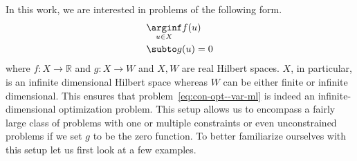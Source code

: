 In this work, we are interested in problems of the following form.
\begin{equation}
\begin{aligned}
    &\underset{u\in X}\arginf f(u)\\
    &\subto g(u)=0 
\end{aligned}   \label{eq:con-opt--var-ml}
\end{equation}
where $f :X\to\mathbb R$ and $g: X\to W$ and $X, W$ are real Hilbert spaces. $X$, in particular, is an infinite dimensional Hilbert space whereas $W$ can be either finite or infinite dimensional. This ensures that problem~\eqref{eq:con-opt--var-ml} is indeed an infinite-dimensional optimization problem. This setup allows us to encompass a fairly large class of problems with one or multiple constraints or even unconstrained problems if we set $g$ to be the zero function. 
To better familiarize ourselves with this setup let us first look at a few examples.
